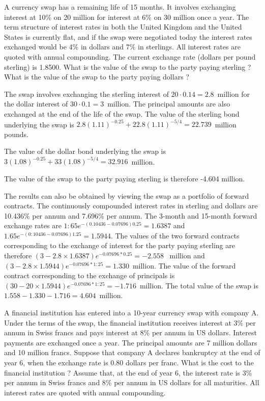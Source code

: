 \documentclass[12pt,a4paper]{exam}
\begin{document}
\begin{questions}
\question A currency swap has a remaining life of 15 months. It involves exchanging interest at 10\% on 20 million for interest at 6\% on 30 million once a year. The term structure of interest rates in both the United Kingdom and the United States is currently flat,
and if the swap were negotiated today the interest rates exchanged would be 4\% in dollars and 7\% in sterlings. All interest rates are quoted with annual compounding. The current exchange rate (dollars per pound sterling) is 1.8500. What is the value of the swap to the party paying sterling ? What is the value of the swap to the party paying dollars ?

\begin{solution}
The swap involves exchanging the sterling interest of $20\cdot 0.14 = 2.8$~million for the dollar interest of $30\cdot 0.1 = 3$~million. 
The principal amounts are also exchanged at the end of the life of the swap. The value of the sterling bond underlying the swap is
$2.8(1.11)^{-0.25} + 22.8(1.11)^{-5/4} = 22.739$~million pounds.

The value of the dollar bond underlying the swap is $3(1.08)^{-0.25} + 33(1.08)^{-5/4} = 32.916$~million.

The value of the swap to the party paying sterling is therefore
-4.604 million.

The results can also be obtained by viewing the swap as a portfolio of forward contracts. The continuously compounded interest rates in sterling and dollars are 10.436\% per annum and 7.696\% per annum. The 3-month and 15-month forward exchange rates are
$1:65e^{-(0.10436-0.07696)0.25}= 1.6387$ and $1.65e^{-(0:10436-0.07696)1.25} = 1.5944$.
The values of the two forward contracts corresponding to the exchange of interest for the party paying sterling are therefore
$(3-2.8\times  1.6387) e^{-0.07696*0.25} = -2.558$~ million
and $(3- 2.8\times  1.5944) e^{-0.07696*1:25} = 1.330$~million.
The value of the forward contract corresponding to the exchange of principals is $(30-20\times 1.5944) e^{-0.07696*1:25} = -1.716$~million.
The total value of the swap is $1.558-1.330-1.716 = 4.604$~million.
\end{solution}

\question A financial institution has entered into a 10-year currency swap with company A.
Under the terms of the swap, the financial institution receives interest at 3\% per annum in Swiss francs and pays interest at 8\% per annum in US dollars. Interest payments are exchanged once a year. The principal amounts are 7 million dollars and 10 million
francs. Suppose that company A declares bankruptcy at the end of year 6, when the exchange rate is 0.80 dollars per franc. What is the cost to the financial institution ? Assume that, at the end of year 6, the interest rate is 3\% per annum in Swiss francs and 8\%
per annum in US dollars for all maturities. All interest rates are quoted with annual compounding.


\end{questions}
\end{document}
